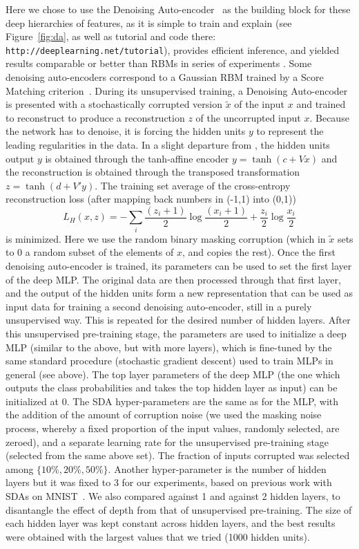 \documentclass{article} %
\begin{document}
Here we chose to use the Denoising
Auto-encoder~\citep{VincentPLarochelleH2008-very-small} as the building block for
these deep hierarchies of features, as it is simple to train and
explain (see Figure~\ref{fig:da}, as well as 
tutorial and code there: {\tt http://deeplearning.net/tutorial}), 
provides efficient inference, and yielded results
comparable or better than RBMs in series of experiments
\citep{VincentPLarochelleH2008-very-small}. 
Some denoising auto-encoders correspond 
to a Gaussian
RBM trained by a Score Matching criterion~\cite{Vincent-SM-2010}.
During its unsupervised training, a Denoising
Auto-encoder is presented with a stochastically corrupted version $\tilde{x}$
of the input $x$ and trained to reconstruct to produce a reconstruction $z$ 
of the uncorrupted input $x$. Because the network has to denoise, it is
forcing the hidden units $y$ to represent the leading regularities in
the data. In a slight departure from \citet{VincentPLarochelleH2008-very-small},
the hidden units output $y$ is obtained through the tanh-affine
encoder
$y=\tanh(c+V x)$
and the reconstruction is obtained through the transposed transformation
$z=\tanh(d+V' y)$.
The training
set average of the cross-entropy
reconstruction loss (after mapping back numbers in (-1,1) into (0,1))
\[
 L_H(x,z)=-\sum_i \frac{(z_i+1)}{2} \log \frac{(x_i+1)}{2} + \frac{z_i}{2} \log\frac{x_i}{2}
\]
is minimized.
Here we use the random binary masking corruption
(which in $\tilde{x}$ sets to 0 a random subset of the elements of $x$, and
copies the rest).
Once the first denoising auto-encoder is trained, its parameters can be used
to set the first layer of the deep MLP. The original data are then processed
through that first layer, and the output of the hidden units form a new
representation that can be used as input data for training a second denoising
auto-encoder, still in a purely unsupervised way.
This is repeated for the desired number of hidden layers.
After this unsupervised pre-training stage, the parameters
are used to initialize a deep MLP (similar to the above, but
with more layers), which is fine-tuned by
the same standard procedure (stochastic gradient descent)
used to train MLPs in general (see above).
The top layer parameters of the deep MLP (the one which outputs the
class probabilities and takes the top hidden layer as input) can
be initialized at 0.
The SDA hyper-parameters are the same as for the MLP, with the addition of the
amount of corruption noise (we used the masking noise process, whereby a
fixed proportion of the input values, randomly selected, are zeroed), and a
separate learning rate for the unsupervised pre-training stage (selected
from the same above set). The fraction of inputs corrupted was selected
among $\{10\%, 20\%, 50\%\}$. Another hyper-parameter is the number
of hidden layers but it was fixed to 3 for our experiments,
based on previous work with
SDAs on MNIST~\citep{VincentPLarochelleH2008-very-small}.
We also compared against 1 and against 2 hidden layers, 
to disantangle the effect of depth from that of unsupervised
pre-training.
The size of each hidden
layer was kept constant across hidden layers, and the best results
were obtained with the largest values that we tried
(1000 hidden units).
\end{document}
